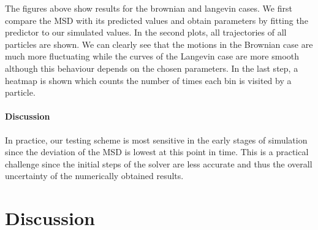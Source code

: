 The figures above show results for the brownian and langevin cases.
We first compare the MSD with its predicted values and obtain parameters by fitting the predictor
to our simulated values.
In the second plots, all trajectories of all particles are shown.
We can clearly see that the motions in the Brownian case are much more fluctuating while the curves
of the Langevin case are more smooth although this behaviour depends on the chosen parameters.
In the last step, a heatmap is shown which counts the number of times each bin is visited by a
particle.

\paragraph{Discussion}
In practice, our testing scheme is most sensitive in the early stages of simulation since the
deviation of the MSD is lowest at this point in time.
This is a practical challenge since the initial steps of the solver are less accurate and thus the
overall uncertainty of the numerically obtained results.

\section{Discussion}
